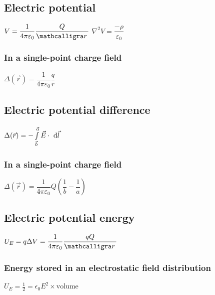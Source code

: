 		\subsection{Electric potential}
        
\begin{itemize}
\itemt \( V = \dfrac{1}{4\pi\varepsilon_0} \dfrac{Q}{\scriptr} \)
\itemt \( \nabla^2 V = \dfrac{-\rho}{\varepsilon_0} \)
\end{itemize}

\subsubsection{In a single-point charge field}
\begin{itemize}
\itemt \( \Delta (\vec{r}) = \dfrac{1}{4\pi\varepsilon_0}\dfrac{q}{r} \)
\end{itemize}
        
        \subsection{Electric potential difference}
        
\begin{itemize}
\itemt \( \Delta (\vec{r}) = - \int\limits_{\vec{b}}^{\vec{a}} \vec{E}\cdot\ \mathrm{d}\vec{l} \)
\end{itemize}

\subsubsection{In a single-point charge field}
\begin{itemize}
\itemt \( \Delta (\vec{r}) = \dfrac{1}{4\pi\varepsilon_0} Q (\dfrac{1}{b} - \dfrac{1}{a}) \)
\end{itemize}

		\subsection{Electric potential energy}
        
\begin{itemize}
\itemt \( U_E = q\Delta V = \dfrac{1}{4\pi \varepsilon_0} \dfrac{qQ}{\scriptr} \)
\end{itemize}

\subsubsection{Energy stored in an electrostatic field distribution}
\begin{itemize}
\itemt \( U_E = \frac{1}{2} =\epsilon_0 E^2 \times \mathrm{volume} \)
\end{itemize}

